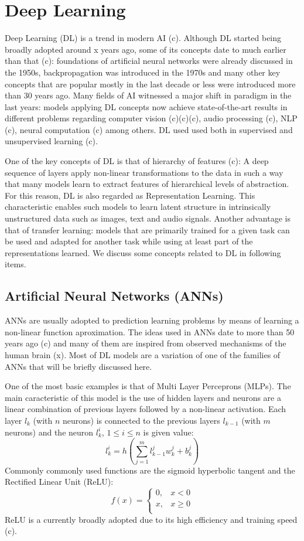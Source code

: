 \documentclass[English]{style/ic-tese-v3}
\begin{document}
\section{Deep Learning}
Deep Learning (DL) is a trend in modern AI (c).
Although DL started being broadly adopted around x years ago,
some of its concepts date to much earlier than that (c):
foundations of artificial neural networks were already discussed
in the 1950s, backpropagation was introduced in the 1970s
and many other key concepts that are popular mostly in the last decade or less
were introduced more than 30 years ago.
Many fields of AI witnessed a major shift in paradigm
in the last years: models applying DL concepts now achieve state-of-the-art
results in different problems regarding computer vision (c)(c)(c),
audio processing (c), NLP (c), neural computation (c) among others.
DL used used both in supervised and unsupervised learning (c).

One of the key concepts of DL is that of hierarchy of features (c):
A deep sequence of layers apply non-linear transformations to the data
in such a way that many models learn to extract features of hierarchical
levels of abstraction.
For this reason, DL is also regarded as Representation Learning.
This characteristic enables such models to learn latent structure
in intrinsically unstructured data such as images, text and audio signals.
Another advantage is that of transfer learning: models that are
primarily trained for a given task can be used and adapted for another
task while using at least part of the representations learned.
We discuss some concepts related to DL in following items.

\subsection{Artificial Neural Networks (ANNs)}
ANNs are usually adopted to prediction
learning problems by means of learning a non-linear function aproximation.
The ideas used in ANNs date to more than 50 years ago (c) and many of them
are inspired from observed mechanisms of the human brain (x).
Most of DL models are a variation of one of the families of ANNs
that will be briefly discussed here.

One of the most basic examples is that of Multi Layer Perceprons (MLPs).
The main caracteristic of this model is the use of hidden layers
and neurons are a linear combination of previous layers followed by
a non-linear activation.
Each layer $l_k$ (with $n$ neurons) is connected to the previous layers
$l_{k-1}$ (with $m$ neurons) and the neuron $l_k^i$, $1 \le i \le n$
is given value:
$$l_k^i = h\left(\sum_{j=1}^{m} l_{k-1}^jw_k^j + b_k^j\right)$$
Commonly commonly used functions are the sigmoid hyperbolic tangent
and the Rectified Linear Unit (ReLU):
$$f(x) = \begin{cases}
    0, & x < 0 \\
    x, & x \ge 0 \\
        \end{cases}
$$
ReLU is a currently broadly adopted due to its high efficiency
and training speed (c).
\end{document}

